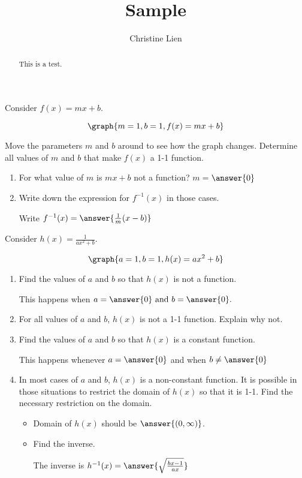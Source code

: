 \documentclass{ximera}
\title{Sample}
\author{Christine Lien}
\begin{document}
\begin{abstract}
This is a test. 
\end{abstract}
\maketitle

Consider $f(x)=mx+b$. 

\[\graph{m=1, b=1, f(x)=mx+b}\]

Move the parameters $m$ and $b$ around to see how the graph changes. 
Determine all values of $m$ and $b$ that make $f(x)$ a 1-1 function. 
\begin{exercise} 
\hfill
\begin{enumerate}
\item For what value of $m$ is $mx+b$ not a function? $m=$$\answer{0}$



\item Write down the expression for $f^{-1}(x)$ in those cases. 

Write $f^{-1}(x)= \answer{\frac{1}{m}(x-b)}$

\end{enumerate}

\end{exercise}

\begin{exercise}
Consider $h(x)=\frac{1}{ax^2+b}$. 

\[\graph{a=1, b=1, h(x)=ax^2+b}\]

\begin{enumerate}
\item Find the values of $a$ and $b$ so that $h(x)$ is not a function. 

This happens when $a=\answer{0} \textrm{ and } b=\answer{0}.$

\item For all values of $a$ and $b$, $h(x)$ is not a 1-1 function. Explain why not.


\item Find the values of $a$ and $b$ so that $h(x)$ is a constant function. 

This happens whenever $a=\answer{0}$  and when $b\neq\answer{0}$

\item In most cases of $a$ and $b$, $h(x)$ is a non-constant function. It is possible in those situations to restrict the domain of $h(x)$ so that it is 1-1. Find the necessary restriction on the domain. 

\begin{itemize}
\item Domain of $h(x)$ should be $\answer{(0, \infty)}$.

\item Find the inverse. 

The inverse is $h^{-1}(x) = \answer{\sqrt{\frac{bx-1}{ax}}}$

\end{itemize}
\end{enumerate} 

\end{exercise}
\end{document}

